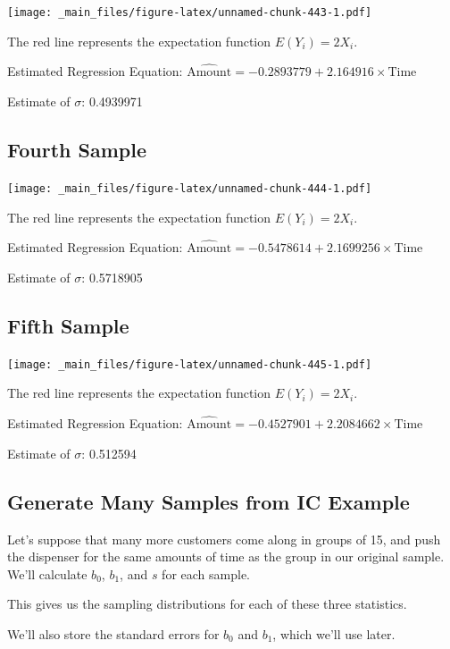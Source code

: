 \documentclass[]{book}
\begin{document}
\texttt{[image: \_main\_files/figure-latex/unnamed-chunk-443-1.pdf]}

The red line represents the expectation function \(E(Y_i) = 2X_i\).

Estimated Regression Equation:
\(\widehat{\text{Amount}} = -0.2893779 + 2.164916\times \text{Time}\)

Estimate of \(\sigma\): 0.4939971

\subsection{Fourth Sample}\label{fourth-sample}

\texttt{[image: \_main\_files/figure-latex/unnamed-chunk-444-1.pdf]}

The red line represents the expectation function \(E(Y_i) = 2X_i\).

Estimated Regression Equation:
\(\widehat{\text{Amount}} = -0.5478614 + 2.1699256\times \text{Time}\)

Estimate of \(\sigma\): 0.5718905

\subsection{Fifth Sample}\label{fifth-sample}

\texttt{[image: \_main\_files/figure-latex/unnamed-chunk-445-1.pdf]}

The red line represents the expectation function \(E(Y_i) = 2X_i\).

Estimated Regression Equation:
\(\widehat{\text{Amount}} = -0.4527901 + 2.2084662\times \text{Time}\)

Estimate of \(\sigma\): 0.512594

\subsection{Generate Many Samples from IC
Example}\label{generate-many-samples-from-ic-example}

Let's suppose that many more customers come along in groups of 15, and
push the dispenser for the same amounts of time as the group in our
original sample. We'll calculate \(b_0\), \(b_1\), and \(s\) for each
sample.

This gives us the sampling distributions for each of these three
statistics.

We'll also store the standard errors for \(b_0\) and \(b_1\), which
we'll use later.
\end{document}
